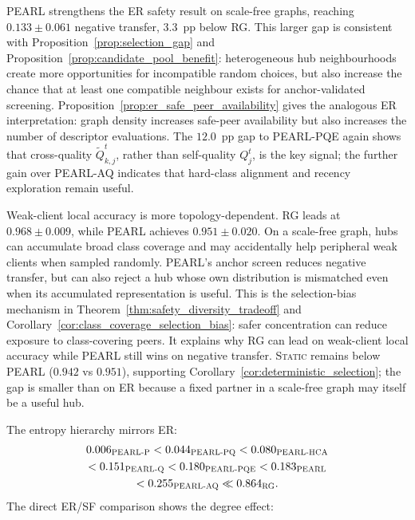 \documentclass[conference]{IEEEtran}
\begin{document}
\textsc{PEARL} strengthens the ER safety result on scale-free graphs, reaching $0.133\pm0.061$ negative transfer, $3.3$~pp below \textsc{RG}. This larger gap is consistent with Proposition~\ref{prop:selection_gap} and Proposition~\ref{prop:candidate_pool_benefit}: heterogeneous hub neighbourhoods create more opportunities for incompatible random choices, but also increase the chance that at least one compatible neighbour exists for anchor-validated screening. Proposition~\ref{prop:er_safe_peer_availability} gives the analogous ER interpretation: graph density increases safe-peer availability but also increases the number of descriptor evaluations. The $12.0$~pp gap to \textsc{PEARL-PQE} again shows that cross-quality \(\tilde{Q}_{k,j}^t\), rather than self-quality \(Q_j^t\), is the key signal; the further gain over \textsc{PEARL-AQ} indicates that hard-class alignment and recency exploration remain useful.

Weak-client local accuracy is more topology-dependent. \textsc{RG} leads at $0.968\pm0.009$, while \textsc{PEARL} achieves $0.951\pm0.020$. On a scale-free graph, hubs can accumulate broad class coverage and may accidentally help peripheral weak clients when sampled randomly. PEARL's anchor screen reduces negative transfer, but can also reject a hub whose own distribution is mismatched even when its accumulated representation is useful. This is the selection-bias mechanism in Theorem~\ref{thm:safety_diversity_tradeoff} and Corollary~\ref{cor:class_coverage_selection_bias}: safer concentration can reduce exposure to class-covering peers. It explains why \textsc{RG} can lead on weak-client local accuracy while \textsc{PEARL} still wins on negative transfer. \textsc{Static} remains below \textsc{PEARL} ($0.942$ vs $0.951$), supporting Corollary~\ref{cor:deterministic_selection}; the gap is smaller than on ER because a fixed partner in a scale-free graph may itself be a useful hub.

The entropy hierarchy mirrors ER:
\begin{equation*}
\begin{gathered}
0.006_{\text{\scshape PEARL-P}} < 0.044_{\text{\scshape PEARL-PQ}} <
0.080_{\text{\scshape PEARL-HCA}}\\
< 0.151_{\text{\scshape PEARL-Q}} < 0.180_{\text{\scshape PEARL-PQE}} <
0.183_{\text{\scshape PEARL}}\\
< 0.255_{\text{\scshape PEARL-AQ}} \ll 0.864_{\text{\scshape RG}}.
\end{gathered}
\end{equation*}
The direct ER/SF comparison shows the degree effect:
\end{document}
